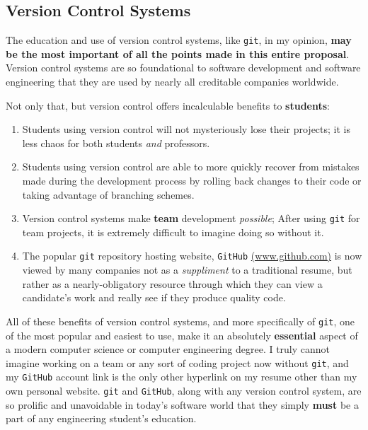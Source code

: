 \documentclass[12pt]{article}
\numberwithin{figure}{section}
\numberwithin{equation}{section}
\begin{document}
{\subsection{Version Control Systems}\label{git}
The education and use of version control systems, like \texttt{git}, in
my opinion, \textbf{may be the most important of all the points made in
this entire proposal}. Version control systems are so foundational to
software development and software engineering that they are used by
nearly all creditable companies worldwide.

\bigskip

Not only that, but version control offers incalculable benefits to
\textbf{students}:

\begin{enumerate}
\itemsep1pt\parskip0pt
\item   Students using version control will not mysteriously lose their
        projects; it is less chaos for both students \emph{and} professors.
\item   Students using version control are able to more quickly recover from
        mistakes made during the development process by rolling back changes
        to their code or taking advantage of branching schemes.
\item   Version control systems make \textbf{team} development
        \emph{possible}; After using \texttt{git} for team projects, it is
        extremely difficult to imagine doing so without it.
\item   The popular \texttt{git} repository hosting website, \texttt{GitHub}
        \href{www.github.com}{(www.github.com)} is now viewed by many
        companies not as a \emph{suppliment} to a traditional resume, but
        rather as a nearly-obligatory resource through which they can view a
        candidate's work and really see if they produce quality code.
\end{enumerate}

All of these benefits of version control systems, and more specifically
of \texttt{git}, one of the most popular and easiest to use, make it an
absolutely \textbf{essential} aspect of a modern computer science or
computer engineering degree. I truly cannot imagine working on a team or
any sort of coding project now without \texttt{git}, and my
\texttt{GitHub} account link is the only other hyperlink on my resume
other than my own personal website. \texttt{git} and \texttt{GitHub},
along with any version control system, are so prolific and unavoidable
in today's software world that they simply \textbf{must} be a part of
any engineering student's education.

}
\end{document}
